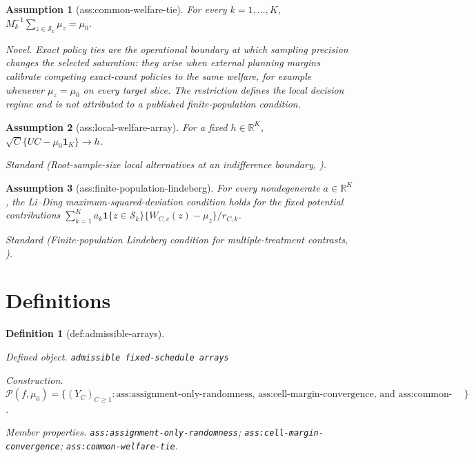 \documentclass{article}
\newtheorem{assumption}{Assumption}
\newtheorem{definition}{Definition}
\begin{document}
\begin{assumption}[ass:common-welfare-tie]\label{ass:common-welfare-tie}
For every \(k=1,\ldots,K\), \(M_k^{-1}\sum_{z\in\mathcal S_k}\mu_z=\mu_0\).
\par\smallskip\noindent\emph{Novel.} Exact policy ties are the operational boundary at which sampling precision changes the selected saturation: they arise when external planning margins calibrate competing exact-count policies to the same welfare, for example whenever \(\mu_z=\mu_0\) on every target slice. The restriction defines the local decision regime and is not attributed to a published finite-population condition.
\end{assumption}

\begin{assumption}[ass:local-welfare-array]\label{ass:local-welfare-array}
For a fixed \(h\in\mathbb R^K\), \(\sqrt C\{UC-\mu_0\mathbf 1_K\}\to h\).
\par\smallskip\noindent\emph{Standard} (Root-sample-size local alternatives at an indifference boundary, \cite{HiranoPorter2009}).
\end{assumption}

\begin{assumption}[ass:finite-population-lindeberg]\label{ass:finite-population-lindeberg}
For every nondegenerate \(a\in\mathbb R^K\), the Li--Ding maximum-squared-deviation condition holds for the fixed potential contributions \(\sum_{k=1}^{K}a_k\mathbf 1\{z\in\mathcal S_k\}\{W_{C,c}(z)-\mu_z\}/r_{C,k}\).
\par\smallskip\noindent\emph{Standard} (Finite-population Lindeberg condition for multiple-treatment contrasts, \cite{LiDing2017}).
\end{assumption}

\section{Definitions}

\begin{definition}[def:admissible-arrays]\label{def:admissible-arrays}
\par\smallskip\noindent\emph{Defined object.} \texttt{admissible fixed-\allowbreak{}schedule arrays}
\par\smallskip\noindent\emph{Construction.} \(\mathcal P(f,\mu_0)=\{(Y_C)_{C\ge1}:\text{ass:assignment-only-randomness, ass:cell-margin-convergence, and ass:common-welfare-tie hold}\}\).
\par\smallskip\noindent\emph{Member properties.} \texttt{ass:\allowbreak{}assignment-\allowbreak{}only-\allowbreak{}randomness}; \texttt{ass:\allowbreak{}cell-\allowbreak{}margin-\allowbreak{}convergence}; \texttt{ass:\allowbreak{}common-\allowbreak{}welfare-\allowbreak{}tie}.
\end{definition}
\end{document}
